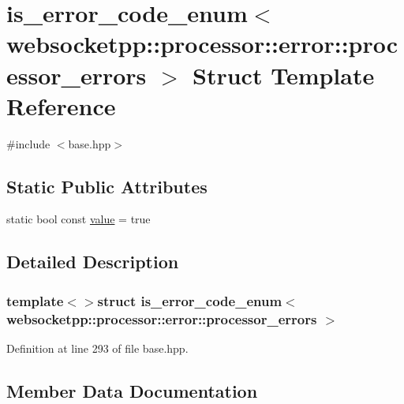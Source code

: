 \hypertarget{structis__error__code__enum_3_01websocketpp_1_1processor_1_1error_1_1processor__errors_01_4}{}\section{is\+\_\+error\+\_\+code\+\_\+enum$<$ websocketpp\+:\+:processor\+:\+:error\+:\+:processor\+\_\+errors $>$ Struct Template Reference}
\label{structis__error__code__enum_3_01websocketpp_1_1processor_1_1error_1_1processor__errors_01_4}


{\ttfamily \#include $<$base.\+hpp$>$}

\subsection*{Static Public Attributes}
\begin{DoxyCompactItemize}
\item 
static bool const \hyperlink{structis__error__code__enum_3_01websocketpp_1_1processor_1_1error_1_1processor__errors_01_4_a981549f083d0fb7c2c7afa8184e59056}{value} = true
\end{DoxyCompactItemize}


\subsection{Detailed Description}
\subsubsection*{template$<$$>$struct is\+\_\+error\+\_\+code\+\_\+enum$<$ websocketpp\+::processor\+::error\+::processor\+\_\+errors $>$}



Definition at line 293 of file base.\+hpp.



\subsection{Member Data Documentation}
\hypertarget{structis__error__code__enum_3_01websocketpp_1_1processor_1_1error_1_1processor__errors_01_4_a981549f083d0fb7c2c7afa8184e59056}{}
